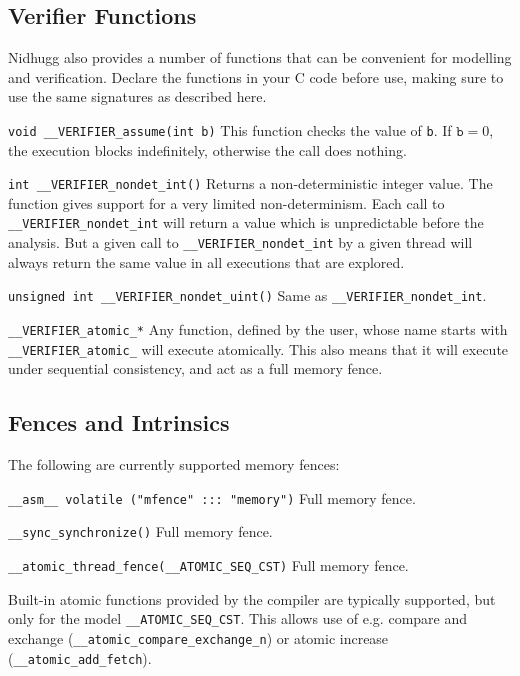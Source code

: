 \documentclass[a4paper]{article}
\begin{document}
\subsection{Verifier Functions}

Nidhugg also provides a number of functions that can be convenient for
modelling and verification. Declare the functions in your C code
before use, making sure to use the same signatures as described here.

\begin{description}
\item{\texttt{void \_\_VERIFIER\_assume(int b)}}
%
  This function checks the value of \texttt{b}. If $\texttt{b} = 0$,
  the execution blocks indefinitely, otherwise the call does nothing.
\item{\texttt{int \_\_VERIFIER\_nondet\_int()}}
%
  Returns a non-deterministic integer value. The function gives
  support for a very limited non-determinism. Each call to
  \texttt{\_\_VERIFIER\_nondet\_int} will return a value which is
  unpredictable before the analysis. But a given call to
  \texttt{\_\_VERIFIER\_nondet\_int} by a given thread will always
  return the same value in all executions that are explored.
\item{\texttt{unsigned int \_\_VERIFIER\_nondet\_uint()}}
%
  Same as \texttt{\_\_VERIFIER\_nondet\_int}.
\item{\texttt{\_\_VERIFIER\_atomic\_*}}
%
  Any function, defined by the user, whose name starts with
  \texttt{\_\_VERIFIER\_atomic\_} will execute atomically. This also
  means that it will execute under sequential consistency, and act as
  a full memory fence.
\end{description}

\subsection{Fences and Intrinsics}

The following are currently supported memory fences:

\begin{description}
\item{\texttt{\_\_asm\_\_ volatile ("mfence" ::: "memory")}} Full memory fence.
\item{\texttt{\_\_sync\_synchronize()}} Full memory fence.
\item{\texttt{\_\_atomic\_thread\_fence(\_\_ATOMIC\_SEQ\_CST)}} Full memory fence.
\end{description}

Built-in atomic functions provided by the compiler are typically
supported, but only for the model \texttt{\_\_ATOMIC\_SEQ\_CST}. This
allows use of e.g. compare and exchange
(\texttt{\_\_atomic\_compare\_exchange\_n}) or atomic increase\\
(\texttt{\_\_atomic\_add\_fetch}).
\end{document}

